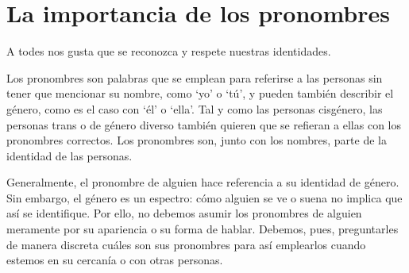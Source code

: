 \documentclass[12pt,openany]{book}
\renewcommand\fbox{\fcolorbox{darkgray}{purple}}
\begin{document}
\section*{La importancia de los pronombres}

A todes nos gusta que se reconozca y respete nuestras identidades.

Los pronombres son palabras que se emplean para referirse a las personas sin tener que mencionar su nombre, como `yo' o `tú', y pueden también describir el género, como es el caso con `él' o `ella'. Tal y como las personas cisgénero, las personas trans o de género diverso también quieren que se refieran a ellas con los pronombres correctos. Los pronombres son, junto con los nombres, parte de la identidad de las personas.

\begin{figure}[h]
    \centering
\end{figure}

Generalmente, el pronombre de alguien hace referencia a su identidad de género. Sin embargo, el género es un espectro: cómo alguien se ve o suena no implica que así se identifique. Por ello, no debemos asumir los pronombres de alguien meramente por su apariencia o su forma de hablar. Debemos, pues, preguntarles de manera discreta cuáles son sus pronombres para así emplearlos cuando estemos en su cercanía o con otras personas.

\noindent\fbox{%
    \parbox{\textwidth}{%
\textit{\textbf{\Large \textcolor{white}{El pronombre `elle' y el masculino genérico}}}

\bigskip

\textcolor{white}{El pronombre `elle' se usa para referirse, generalmente, a personas cuyas identidades van más allá de las opciones `hombre' o `mujer'. Un ejemplo de su uso es: `Elle me dio su paraguas antes de irse'. En español, tendemos a usar la `o' del masculino genérico para referirnos o adjetivar a un grupo de personas sin importar cómo se identifican, siempre y cuando haya un solo hombre en dicho grupo. Para evitar este masculino genérico que puede invisibilizar a otras personas que no se identifican como hombres, podemos recurrir a usar la `e' en el discurso oral y la `e' y/o la `x' en discursos escritos: `todes', `todxs', `les demás', `lxs demás', `sabies', `sabixs'…}
    }%
}
\end{document}
